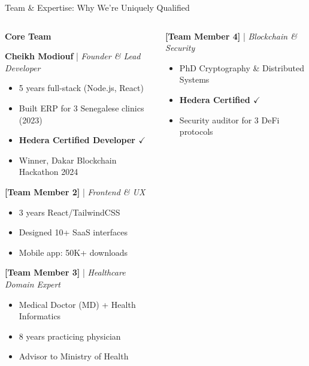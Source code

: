 \documentclass[aspectratio=169,xcolor=dvipsnames,14pt]{beamer}
\begin{document}
\begin{frame}{Team \& Expertise: Why We're Uniquely Qualified}

  \begin{columns}[T]
    \begin{column}{0.5\textwidth}
      \textbf{\textcolor{FadjmaBlue}{Core Team}}

      \textbf{Cheikh Modiouf} | \textit{Founder \& Lead Developer}
      \begin{itemize}
        \item 5 years full-stack (Node.js, React)
        \item Built ERP for 3 Senegalese clinics (2023)
        \item \textcolor{SuccessGreen}{\textbf{Hedera Certified Developer $\checkmark$}}
        \item Winner, Dakar Blockchain Hackathon 2024
      \end{itemize}

      \vspace{0.2cm}

      \textbf{[Team Member 2]} | \textit{Frontend \& UX}
      \begin{itemize}
        \item 3 years React/TailwindCSS
        \item Designed 10+ SaaS interfaces
        \item Mobile app: 50K+ downloads
      \end{itemize}

      \vspace{0.2cm}

      \textbf{[Team Member 3]} | \textit{Healthcare Domain Expert}
      \begin{itemize}
        \item Medical Doctor (MD) + Health Informatics
        \item 8 years practicing physician
        \item Advisor to Ministry of Health
      \end{itemize}
    \end{column}

    \begin{column}{0.5\textwidth}
      \textbf{[Team Member 4]} | \textit{Blockchain \& Security}
      \begin{itemize}
        \item PhD Cryptography \& Distributed Systems
        \item \textcolor{SuccessGreen}{\textbf{Hedera Certified $\checkmark$}}
        \item Security auditor for 3 DeFi protocols
      \end{itemize}


\end{column}
\end{columns}
\end{frame}
\end{document}
